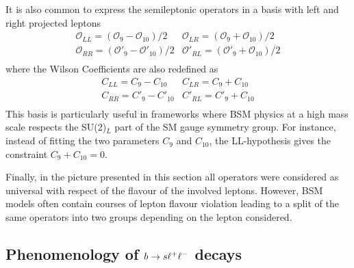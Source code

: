It is also common to express the semileptonic operators in a basis with left and right projected leptons
%
\begin{equation}
\begin{array}{ll}
\mathcal{O}_{LL} = ( \mathcal{O}_{9} - \mathcal{O}_{10})/2 & \mathcal{O}_{LR} = ( \mathcal{O}_{9} + \mathcal{O}_{10})/2 \\
\mathcal{O}_{RR} = ( \mathcal{O}'_{9} - \mathcal{O}'_{10})/2 & \mathcal{O}'_{RL} = ( \mathcal{O}'_{9} + \mathcal{O}_{10})/2 \\
\end{array}
\end{equation}
%
where the Wilson Coefficients are also redefined as
\begin{equation}
\begin{array}{ll}
C_{LL} = C_{9} - C_{10} & C_{LR} =  C_{9} + C_{10} \\
C_{RR} = C'_{9} - C'_{10} &C'_{RL} =  C'_{9} +C_{10} \\
\end{array}
\end{equation}
%
This basis is particularly useful in frameworks where BSM physics at a high mass scale
respects the SU(2)$_L$ part of the SM gauge symmetry group.
For instance, instead of fitting the two parameters $C_9$
and $C_{10}$, the LL-hypothesis gives the constraint $C_9 + C_{10} = 0$.

Finally, in the picture presented in this section all operators were considered as universal
with respect of the flavour of the involved leptons. However, BSM models often contain courses of
lepton flavour violation leading to a split of the same operators into two groups depending on the lepton considered. 

\subsection{Phenomenology of $b\rightarrow s\ell^+\ell^-$ decays}
\label{sec:theo_qsq}

